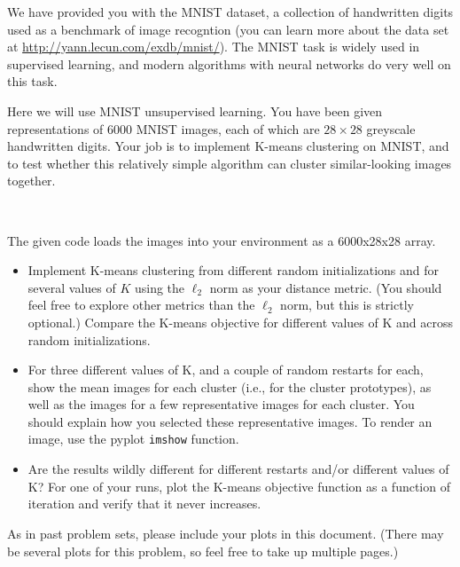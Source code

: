 \documentclass[submit]{harvardml}
\begin{document}
We have provided you with the MNIST dataset, a collection of handwritten digits
used as a benchmark of image recogntion (you  can learn more about the data set
at  \url{http://yann.lecun.com/exdb/mnist/}). The MNIST task is widely used in
supervised learning, and modern algorithms with neural networks do very well on
this task.

Here we will use MNIST unsupervised learning. You have been given
representations of 6000 MNIST images, each of which are $28\times28$ greyscale
handwritten digits. Your job is to implement K-means clustering on MNIST, and
to test whether this relatively simple algorithm can cluster similar-looking
images together.

~

\begin{problem}
The given code loads the images into your environment as a 6000x28x28 array.

\begin{itemize}
\item Implement K-means clustering from different random initializations and
    for several values of $K$ using the $\ell_2$ norm as your distance metric.
    (You should feel free to explore other metrics than the $\ell_2$ norm, but
    this is strictly optional.)  Compare the K-means objective for different
    values of K and across random initializations.

\item For three different values of K, and a couple of random restarts for
    each, show the mean images for each cluster (i.e., for the cluster
    prototypes), as well as the images for a few representative images for each
    cluster. You should explain how you selected these representative images.
    To render an image, use the pyplot \texttt{imshow} function.

\item Are the results wildly different for different restarts and/or different
    values of K?  For one of your runs, plot the K-means objective function as
    a function of iteration and verify that it never increases.


\end{itemize}

As in past problem sets, please include your plots in this document. (There may
be several plots for this problem, so feel free to take up multiple pages.)


\end{problem}
\end{document}
